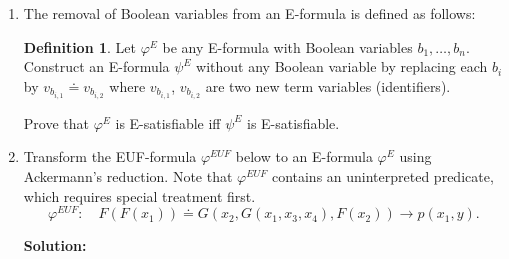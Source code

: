\documentclass[11pt,a4paper]{uebung}
\newcommand{\solution}[1]{\par {\bf Solution:}\\#1}
\begin{document}

\theoremstyle{definition}
\newtheorem*{definition}{Definition}
\begin{enumerate}
  \item The removal of Boolean variables from an E-formula is defined as follows:
    \begin{definition}
      Let $\varphi^E$ be any E-formula with Boolean variables $b_1, \ldots,
      b_n$. Construct an E-formula $\psi^E$ without any Boolean variable by
      replacing each $b_i$ by $v_{b_{i,1}} \doteq v_{b_{i,2}}$ where $v_{b_{i,1}}$,
      $v_{b_{i,2}}$ are two new term variables (identifiers).
    \end{definition}
    Prove that $\varphi^E$ is E-satisfiable iff $\psi^E$ is E-satisfiable.

  \item
    Transform the EUF-formula $\varphi^{EUF}$ below to an E-formula
    $\varphi^E$ using Ackermann's reduction. Note that $\varphi^{EUF}$
    contains an uninterpreted predicate, which requires special treatment
    first.
    \begin{displaymath}
      \varphi^{EUF}: \quad F(F(x_1)) \doteq G(x_2,G(x_1,x_3,x_4),F(x_2)) \rightarrow p(x_1,y).
    \end{displaymath}

\solution{

}
\end{enumerate}
\end{document}

